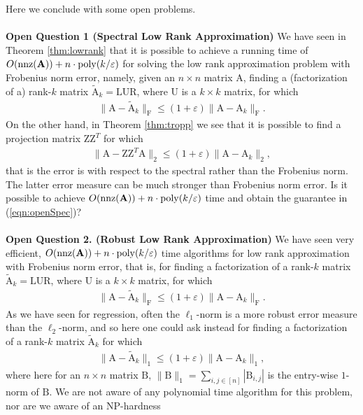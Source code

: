 \documentclass[11pt]{article}
\newcommand{\FNorm }[1]{\mbox{}\|#1\|_\mathrm{F}  }
\newcommand{\mat}[1]{{\ensuremath{\bm{\mathrm{#1}}}}}
\def\matA{\mat{A}}
\def\matB{\mat{B}}
\def\matL{\mat{L}}
\def\matR{\mat{R}}
\def\matU{\mat{U}}
\def\matZ{\mat{Z}}
\def\nnz{{ \rm nnz }}
\newcommand{\eps}{\varepsilon}
\newcommand{\poly}{{\mathrm{poly}}}
\begin{document}
Here we conclude with some open problems.
\\\\
{\bf Open Question 1 (Spectral Low Rank Approximation)} We have seen in Theorem \ref{thm:lowrank} 
that it is possible to achieve a running time of 
$O(\nnz(\matA)) + n \cdot \poly(k/\eps)$ for solving the low rank approximation problem
with Frobenius norm error, namely, given an $n \times n$ matrix $\matA$, finding a (factorization of a) 
rank-$k$ matrix $\tilde{\matA}_k = \matL \matU \matR$, where $\matU$ is a $k \times k$ matrix, for which 
\begin{eqnarray*}
\FNorm{\matA-\tilde{\matA}_k} \leq (1+\eps)\FNorm{\matA-\matA_k}.
\end{eqnarray*}
On the other hand, in Theorem \ref{thm:tropp} we see that it is possible to find a projection matrix
$\matZ\matZ^T$ for which
\begin{eqnarray}\label{eqn:openSpec}
\|\matA-\matZ\matZ^T\matA\|_2 \leq (1+\eps)\|\matA-\matA_k\|_2,
\end{eqnarray}
that is the error is with respect to the spectral rather than the Frobenius norm. The latter error
measure can be much stronger than Frobenius norm error. Is it possible to achieve $O(\nnz(\matA)) + n \cdot \poly(k/\eps)$
time and obtain the guarantee in (\ref{eqn:openSpec})?
\\\\
{\bf Open Question 2. (Robust Low Rank Approximation)} 
We have seen very efficient, $O(\nnz(\matA)) + n \cdot \poly(k/\eps)$ time algorithms
for low rank approximation with Frobenius norm error, that is, for finding a factorization of a rank-$k$ matrix
$\tilde{\matA}_k = \matL \matU \matR$, where $\matU$ is a $k \times k$ matrix, for which 
\begin{eqnarray*}
\FNorm{\matA-\tilde{\matA}_k} \leq (1+\eps)\FNorm{\matA-\matA_k}.
\end{eqnarray*}
As we have seen for regression, often the $\ell_1$-norm is a more robust error measure than the $\ell_2$-norm, and
so here one could ask instead for finding a factorization of a rank-$k$ matrix $\tilde{\matA}_k$ for which
\begin{eqnarray}\label{eqn:openL1}
\|\matA-\tilde{\matA}_k\|_1 \leq (1+\eps)\|\matA-\matA_k\|_1,
\end{eqnarray}
where here for an $n \times n$ matrix $\matB$, $\|\matB\|_1 = \sum_{i, j \in [n]} |\matB_{i,j}|$ is the entry-wise $1$-norm of 
$\matB$. We are not aware of any polynomial time algorithm for this problem, nor are we aware of an NP-hardness
\end{document}
